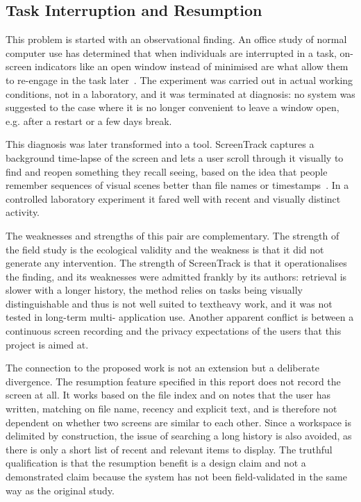 \documentclass{FastFyp}
\begin{document}
\subsection{Task Interruption and Resumption}
This problem is started with an observational finding. An office study of normal computer use has determined that when individuals are interrupted in a task, on-screen indicators like an open window instead of minimised are what allow them to re-engage in the task later~\cite{ref:iqbal2007}. The experiment was carried out in actual working conditions, not in a laboratory, and it was terminated at diagnosis: no system was suggested to the case where it is no longer convenient to leave a window open, e.g. after a restart or a few days break.

This diagnosis was later transformed into a tool. ScreenTrack captures a background time-lapse of the screen and lets a user scroll through it visually to find and reopen something they recall seeing, based on the idea that people remember sequences of visual scenes better than file names or timestamps~\cite{ref:hu2020}. In a controlled laboratory experiment it fared well with recent and visually distinct activity.

The weaknesses and strengths of this pair are complementary. The strength of the field study is the ecological validity and the weakness is that it did not generate any intervention. The strength of ScreenTrack is that it operationalises the finding, and its weaknesses were admitted frankly by its authors: retrieval is slower with a longer history, the method relies on tasks being visually distinguishable and thus is not well suited to textheavy work, and it was not tested in long-term multi- application use. Another apparent conflict is between a continuous screen recording and the privacy expectations of the users that this project is aimed at.

The connection to the proposed work is not an extension but a deliberate divergence. The resumption feature specified in this report does not record the screen at all. It works based on the file index and on notes that the user has written, matching on file name, recency and explicit text, and is therefore not dependent on whether two screens are similar to each other. Since a workspace is delimited by construction, the issue of searching a long history is also avoided, as there is only a short list of recent and relevant items to display. The truthful qualification is that the resumption benefit is a design claim and not a demonstrated claim because the system has not been field-validated in the same way as the original study.
\end{document}
